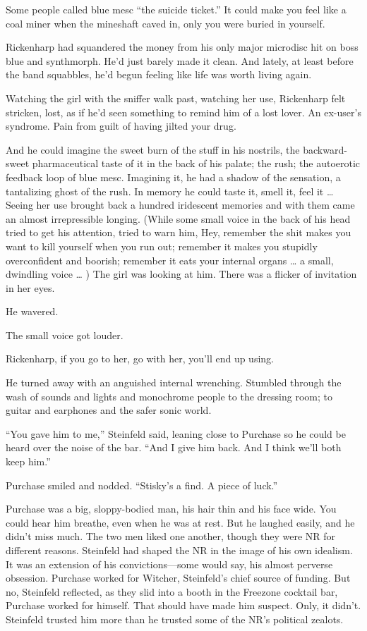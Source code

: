 Some people called blue mesc “the suicide ticket.” It could make you feel like a coal miner when the mineshaft caved in, only you were buried in yourself.

Rickenharp had squandered the money from his only major microdisc hit on boss blue and synthmorph. He’d just barely made it clean. And lately, at least before the band squabbles, he’d begun feeling like life was worth living again.

Watching the girl with the sniffer walk past, watching her use, Rickenharp felt stricken, lost, as if he’d seen something to remind him of a lost lover. An ex-user’s syndrome. Pain from guilt of having jilted your drug.

And he could imagine the sweet burn of the stuff in his nostrils, the backward-sweet pharmaceutical taste of it in the back of his palate; the rush; the autoerotic feedback loop of blue mesc. Imagining it, he had a shadow of the sensation, a tantalizing ghost of the rush. In memory he could taste it, smell it, feel it … Seeing her use brought back a hundred iridescent memories and with them came an almost irrepressible longing. (While some small voice in the back of his head tried to get his attention, tried to warn him, Hey, remember the shit makes you want to kill yourself when you run out; remember it makes you stupidly overconfident and boorish; remember it eats your internal organs … a small, dwindling voice … ) The girl was looking at him. There was a flicker of invitation in her eyes.

He wavered.

The small voice got louder.

Rickenharp, if you go to her, go with her, you’ll end up using.

He turned away with an anguished internal wrenching. Stumbled through the wash of sounds and lights and monochrome people to the dressing room; to guitar and earphones and the safer sonic world.

“You gave him to me,” Steinfeld said, leaning close to Purchase so he could be heard over the noise of the bar. “And I give him back. And I think we’ll both keep him.”

Purchase smiled and nodded. “Stisky’s a find. A piece of luck.”

Purchase was a big, sloppy-bodied man, his hair thin and his face wide. You could hear him breathe, even when he was at rest. But he laughed easily, and he didn’t miss much. The two men liked one another, though they were NR for different reasons. Steinfeld had shaped the NR in the image of his own idealism. It was an extension of his convictions—some would say, his almost perverse obsession. Purchase worked for Witcher, Steinfeld’s chief source of funding. But no, Steinfeld reflected, as they slid into a booth in the Freezone cocktail bar, Purchase worked for himself. That should have made him suspect. Only, it didn’t. Steinfeld trusted him more than he trusted some of the NR’s political zealots.

